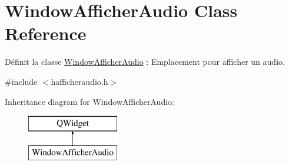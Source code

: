 \hypertarget{class_window_afficher_audio}{}\section{Window\+Afficher\+Audio Class Reference}
\label{class_window_afficher_audio}


Définit la classe \hyperlink{class_window_afficher_audio}{Window\+Afficher\+Audio} \+: Emplacement pour afficher un audio.  




{\ttfamily \#include $<$hafficheraudio.\+h$>$}

Inheritance diagram for Window\+Afficher\+Audio\+:\begin{figure}[H]
\begin{center}
\leavevmode
\includegraphics[height=2.000000cm]{class_window_afficher_audio}
\end{center}
\end{figure}
